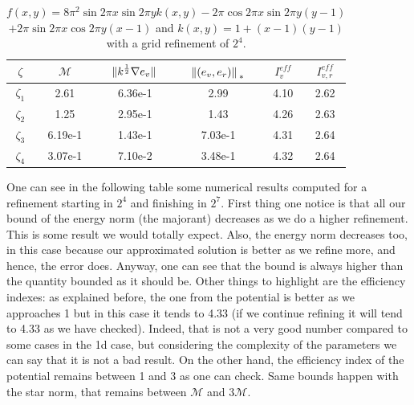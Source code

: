 \documentclass{article}
\begin{document}
	
	
	\begin{table}[h!]
		\centering
		\begin{tabular}{c | c | c | c | c | c }
			$\zeta$ & $\mathcal{M}$  & $\norm*{k^{\frac{1}{2}}\nabla e_v}$ & $\norm*{(e_v,e_r)}_{*}$ & $I_v^{eff}$ & $I_{v,r}^{eff}$ \\
			\hline \hline
			$\zeta_1$ & 2.61 & 6.36e-1 & 2.99 & 4.10 & 2.62 \\ 
			$\zeta_2$ & 1.25 & 2.95e-1 & 1.43 & 4.26 & 2.63 \\
			$\zeta_3$ & 6.19e-1 & 1.43e-1& 7.03e-1 & 4.31 & 2.64 \\
			$\zeta_4$ & 3.07e-1 & 7.10e-2 & 3.48e-1 & 4.32 & 2.64 \\
		\end{tabular}
		\caption{$f(x,y) = 8\pi^2\sin{2\pi x}\sin{2\pi y}k(x,y) - 2\pi\cos{2\pi x}\sin{2\pi y}(y-1)$ $+ 2\pi\sin{2\pi x}\cos{2\pi y}(x-1) $ and 
		$k(x,y) = 1 + (x-1)(y-1)$ with a grid refinement of $2^4$.}
	\end{table}
	One can see in the following table some numerical results computed for a refinement starting in $2^4$ and finishing in $2^7$. First thing one notice is that all our bound of the energy norm (the majorant) decreases as we do a higher refinement. This is some result we would totally expect. Also, the energy norm decreases too, in this case because our approximated solution is better as we refine more, and hence, the error does. Anyway, one can see that the bound is always higher than the quantity bounded as it should be. Other things to highlight are the efficiency indexes: as explained before, the one from the potential is better as we approaches 1 but in this case it tends to 4.33 (if we continue refining it will tend to 4.33 as we have checked). Indeed, that is not a very good number compared to some cases in the 1d case, but considering the complexity of the parameters we can say that it is not a bad result. On the other hand, the efficiency index of the potential remains between 1 and 3 as one can check. Same bounds happen with the star norm, that remains between $\mathcal{M}$ and $3\mathcal{M}$.\\
	
\end{document}
